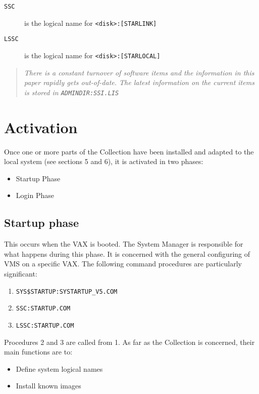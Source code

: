 \begin{description}
\begin{description}
\item [{\tt SSC}] is the logical name for \verb+<disk>:[STARLINK]+
\item [{\tt LSSC}] is the logical name for \verb+<disk>:[STARLOCAL]+
\end{description}
\end{description}

\begin{quote}\em
There is a constant turnover of software items and the information in this
paper rapidly gets out-of-date. The latest information on the current items is
stored in {\tt ADMINDIR:SSI.LIS}
\end{quote}

\section {Activation}
\label{se:active}

Once one or more parts of the Collection have been installed and adapted to the
local system (see sections 5 and 6), it is activated in two phases:

\begin{itemize}
\item Startup Phase
\item Login Phase
\end{itemize}

\subsection {Startup phase}
\label{ss:startup}

This occurs when the VAX is booted. The System Manager is responsible for what
happens during this phase. It is concerned with the general configuring of VMS
on a specific VAX. The following command procedures are particularly
significant:

\begin{enumerate}
\item {\tt SYS\$STARTUP:SYSTARTUP\_V5.COM}
\item {\tt SSC:STARTUP.COM}
\item {\tt LSSC:STARTUP.COM}
\end{enumerate}

Procedures 2 and 3 are called from 1. As far as the Collection is concerned,
their main functions are to:

\begin{itemize}
\item Define system logical names
\item Install known images
\end{itemize}

